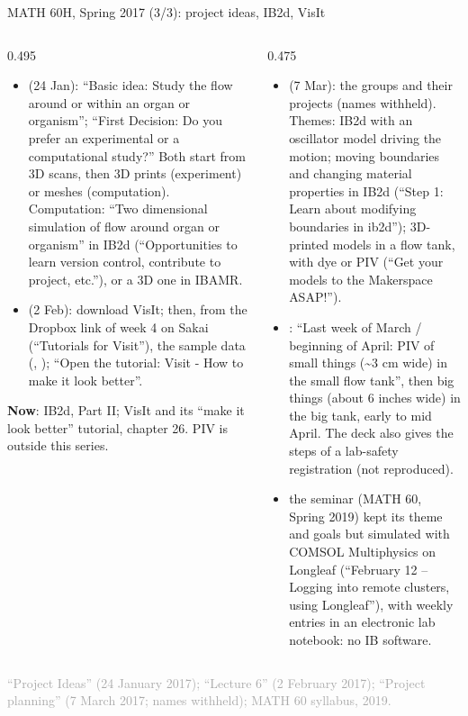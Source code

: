 \documentclass[aspectratio=169,11pt]{beamer}
\newcommand{\sourcecredit}[1]{\vfill\begin{flushright}\tiny\textcolor{DarkGray}{#1}\end{flushright}}
\begin{document}
\begin{frame}{MATH 60H, Spring 2017 (3/3): project ideas, IB2d, VisIt}
\label{fr:m60c}
\begin{columns}[T,onlytextwidth]
\begin{column}{0.495\textwidth}
\footnotesize
\begin{itemize}\setlength{\itemsep}{0.5pt}
  \item {} (24 Jan): ``Basic idea: Study the flow around or within an organ or organism''; ``First Decision: Do you prefer an experimental or a computational study?'' Both start from 3D scans, then 3D prints (experiment) or meshes (computation). Computation: ``Two dimensional simulation of flow around organ or organism'' in IB2d (``Opportunities to learn version control, contribute to project, etc.''), or a 3D one in IBAMR.
  \item {} (2 Feb): download VisIt; then, from the Dropbox link of week 4 on Sakai (``Tutorials for Visit''), the sample data (, ); ``Open the tutorial: Visit - How to make it look better''.
\end{itemize}
\begin{homebox}
\scriptsize \textbf{Now}: IB2d, Part II; VisIt and its ``make it look better'' tutorial, chapter 26. PIV is outside this series.
\end{homebox}
\end{column}
\begin{column}{0.475\textwidth}
\scriptsize
\begin{itemize}\setlength{\itemsep}{3pt}
  \item {} (7 Mar): the groups and their projects (names withheld). Themes: IB2d with an oscillator model driving the motion; moving boundaries and changing material properties in IB2d (``Step 1: Learn about modifying boundaries in ib2d''); 3D-printed models in a flow tank, with dye or PIV (``Get your models to the Makerspace ASAP!'').
  \item {}: ``Last week of March / beginning of April: PIV of small things (\textasciitilde 3 cm wide) in the small flow tank'', then big things (about 6 inches wide) in the big tank, early to mid April. The deck also gives the steps of a lab-safety registration (not reproduced).
  \item {} the seminar (MATH 60, Spring 2019) kept its theme and goals but simulated with COMSOL Multiphysics on Longleaf (``February 12 -- Logging into remote clusters, using Longleaf''), with weekly entries in an electronic lab notebook: no IB software.
\end{itemize}
\end{column}
\end{columns}
\sourcecredit{``Project Ideas'' (24 January 2017); ``Lecture 6'' (2 February 2017); ``Project planning'' (7 March 2017; names withheld); MATH 60 syllabus, 2019.}
\end{frame}
\end{document}
